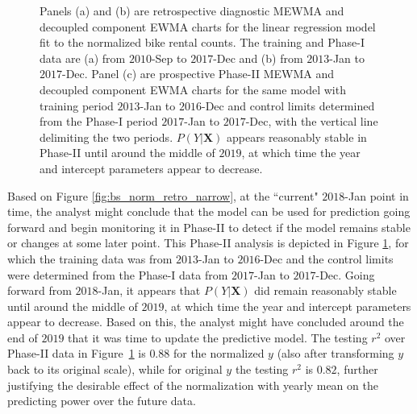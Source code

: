 \documentclass[twoside,11pt]{article}
\begin{document}
\begin{figure}[H]
\begin{subfigure}[t]{0.374\linewidth}
     \captionsetup{width=.95\linewidth}
     \caption{}
     \label{fig:bs_norm_prospective}
\end{subfigure}
\caption{Panels (a) and (b) are retrospective diagnostic MEWMA and decoupled component EWMA charts for the linear regression model fit to the normalized bike rental counts. The training and Phase-I data are (a) from $2010$-Sep to $2017$-Dec and (b) from $2013$-Jan to $2017$-Dec. Panel (c) are prospective Phase-II MEWMA and decoupled component EWMA charts for the same model with training period $2013$-Jan to $2016$-Dec and control limits determined from the Phase-I period $2017$-Jan to $2017$-Dec, with the vertical line delimiting the two periods. $P(Y|\bm{X})$ appears reasonably stable in Phase-II until around the middle of $2019$, at which time the year and intercept parameters appear to decrease.}
\label{fig:bike_sharing_norm}
\end{figure}

Based on Figure \ref{fig:bs_norm_retro_narrow}, at the ``current" $2018$-Jan point in time, the analyst might conclude that the model can be used for prediction going forward and begin monitoring it in Phase-II to detect if the model remains stable or changes at some later point. This Phase-II analysis is depicted in Figure \ref{fig:bs_norm_prospective}, for which the training data was from $2013$-Jan to $2016$-Dec and the control limits were determined from the Phase-I data from $2017$-Jan to $2017$-Dec. Going forward from $2018$-Jan, it appears that $P(Y|\bm{X})$ did remain reasonably stable until around the middle of $2019$, at which time the year and intercept parameters appear to decrease. Based on this, the analyst might have concluded around the end of $2019$ that it was time to update the predictive model. The testing $r^2$ over Phase-II data in Figure~\ref{fig:bs_norm_prospective} is $0.88$ for the normalized $y$ (also after transforming $y$ back to its original scale), while for original $y$ the testing $r^2$ is $0.82$, further justifying the desirable effect of the normalization with yearly mean on the predicting power over the future data.
\end{document}
